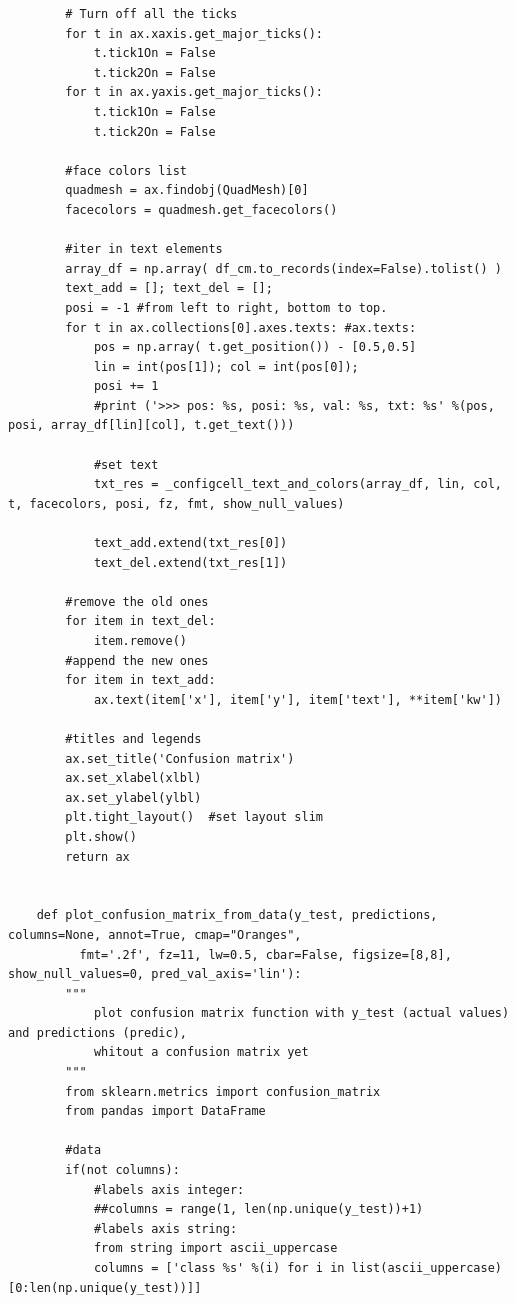 \begin{verbatim}
        # Turn off all the ticks
        for t in ax.xaxis.get_major_ticks():
            t.tick1On = False
            t.tick2On = False
        for t in ax.yaxis.get_major_ticks():
            t.tick1On = False
            t.tick2On = False

        #face colors list
        quadmesh = ax.findobj(QuadMesh)[0]
        facecolors = quadmesh.get_facecolors()

        #iter in text elements
        array_df = np.array( df_cm.to_records(index=False).tolist() )
        text_add = []; text_del = [];
        posi = -1 #from left to right, bottom to top.
        for t in ax.collections[0].axes.texts: #ax.texts:
            pos = np.array( t.get_position()) - [0.5,0.5]
            lin = int(pos[1]); col = int(pos[0]);
            posi += 1
            #print ('>>> pos: %s, posi: %s, val: %s, txt: %s' %(pos, posi, array_df[lin][col], t.get_text()))

            #set text
            txt_res = _configcell_text_and_colors(array_df, lin, col, t, facecolors, posi, fz, fmt, show_null_values)

            text_add.extend(txt_res[0])
            text_del.extend(txt_res[1])

        #remove the old ones
        for item in text_del:
            item.remove()
        #append the new ones
        for item in text_add:
            ax.text(item['x'], item['y'], item['text'], **item['kw'])

        #titles and legends
        ax.set_title('Confusion matrix')
        ax.set_xlabel(xlbl)
        ax.set_ylabel(ylbl)
        plt.tight_layout()  #set layout slim
        plt.show()
        return ax


    def plot_confusion_matrix_from_data(y_test, predictions, columns=None, annot=True, cmap="Oranges",
          fmt='.2f', fz=11, lw=0.5, cbar=False, figsize=[8,8], show_null_values=0, pred_val_axis='lin'):
        """
            plot confusion matrix function with y_test (actual values) and predictions (predic),
            whitout a confusion matrix yet
        """
        from sklearn.metrics import confusion_matrix
        from pandas import DataFrame

        #data
        if(not columns):
            #labels axis integer:
            ##columns = range(1, len(np.unique(y_test))+1)
            #labels axis string:
            from string import ascii_uppercase
            columns = ['class %s' %(i) for i in list(ascii_uppercase)[0:len(np.unique(y_test))]]


\end{verbatim}
